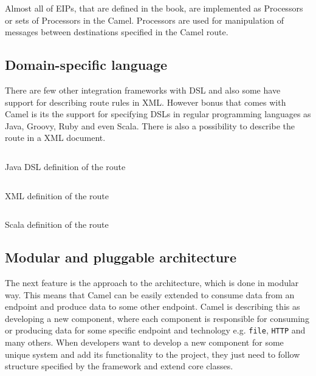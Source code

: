 \documentclass[12pt,final,oneside]{fithesis2}
\begin{document}
Almost all of EIPs, that are defined in the book, are implemented as Processors or sets of Processors in the Camel. Processors are used for manipulation of messages between destinations specified in the Camel route.\cite{camel-dzone}



\subsection*{Domain-specific language}
There are few other integration frameworks with DSL and also some have support for describing route rules in XML. However bonus that comes with Camel is its the support for specifying DSLs in regular programming languages as Java, Groovy, Ruby and even Scala. There is also a possibility to describe the route in a XML document. 

\begin{listing}[ht]
	\inputminted[]{java}{sources/java_dsl_example.java}
	\caption{Java DSL definition of the route}

\end{listing}

\begin{listing}[ht]
	\inputminted[]{xml}{sources/xml_example.xml}
	\caption{XML definition of the route }

\end{listing}

\begin{listing}[ht, p!]
	\inputminted[]{java}{sources/scala_example.java}
	\caption{Scala definition of the route }

\end{listing}


\subsection*{Modular and pluggable architecture}
The next feature is the approach to the architecture, which is done in modular way. This means that Camel can be easily extended to consume data from an endpoint and produce data to some other endpoint. Camel is describing this as developing a new component, where each component is responsible for consuming or producing data for some specific endpoint and technology e.g. \texttt{file}, \texttt{HTTP} and many others. When developers want to develop a new component for some unique system and add its functionality to the project, they just need to follow structure specified by the framework and extend core classes. 
\end{document}
